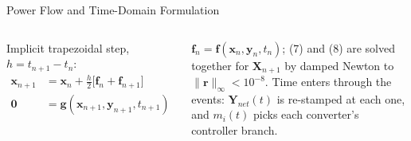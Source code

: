 \documentclass{beamer}
\begin{document}
\begin{frame}{Power Flow and Time-Domain Formulation}
\begin{columns}[t,onlytextwidth]
Implicit trapezoidal step, $h=t_{n+1}-t_n$:
\begin{align}
\bm x_{n+1}&=\bm x_n+\tfrac{h}{2}\bigl[\bm f_n+\bm f_{n+1}\bigr]\\
\bm 0&=\bm g(\bm x_{n+1},\bm y_{n+1},t_{n+1})
\end{align}
\vspace{-0.26cm}

{\tiny$\bm f_n=\bm f(\bm x_n,\bm y_n,t_n)$; (7) and (8) are solved together for
$\bm X_{n+1}$ by damped Newton to $\lVert\bm r\rVert_\infty<10^{-8}$. Time enters
through the events: $\bm Y_{net}(t)$ is re-stamped at each one, and $m_i(t)$
picks each converter's controller branch.}
\end{columns}
\end{frame}

%
%
\end{document}

